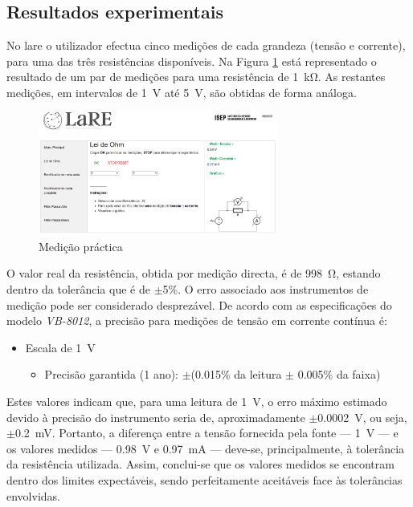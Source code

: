 \subsection{Resultados experimentais}
\label{sec:resultados_praticosOHM}
No \acrshort{lare} o utilizador efectua cinco medições de cada grandeza (tensão e corrente), para uma das três resistências disponíveis. Na Figura \ref{fig:resultados_medicoes_1k} está representado o resultado de um par de medições para uma resistência de \SI{1}{\kilo\ohm}. As restantes medições, em intervalos de \SI{1}{\volt} até \SI{5}{\volt}, são obtidas de forma análoga.

\begin{figure}[hbtp]
	\centering
	\includegraphics[width=0.7\textwidth]{figures/resultados_medicoes_ohm.png}
	\caption{Medição práctica}
	\label{fig:resultados_medicoes_1k}
\end{figure}

O valor real da resistência, obtida por medição directa, é de \SI{998}{\ohm}, estando dentro da tolerância que é de $\pm$5\%. O erro associado aos instrumentos de medição pode ser considerado desprezável. De acordo com as especificações do modelo \textit{VB-8012}\cite{datasheetvb8012}, a precisão para medições de tensão em corrente contínua é:

\begin{itemize}
	\item Escala de \SI{1}{\volt}
	\begin{itemize}
		\item Precisão garantida (1 ano): $\pm$(0.015\% da leitura $\pm$ 0.005\% da faixa)
	\end{itemize}
\end{itemize}

Estes valores indicam que, para uma leitura de \SI{1}{\volt}, o erro máximo estimado devido à precisão do instrumento seria de, aproximadamente $\pm$\SI{0.0002}{\volt}, ou seja, $\pm$\SI{0.2}{\milli\volt}. Portanto, a diferença entre a tensão fornecida pela fonte — \SI{1}{\volt} — e os valores medidos — \SI{0.98}{\volt} e \SI{0.97}{\milli\ampere} — deve-se, principalmente, à tolerância da resistência utilizada. Assim, conclui-se que os valores medidos se encontram dentro dos limites expectáveis, sendo perfeitamente aceitáveis face às tolerâncias envolvidas.

